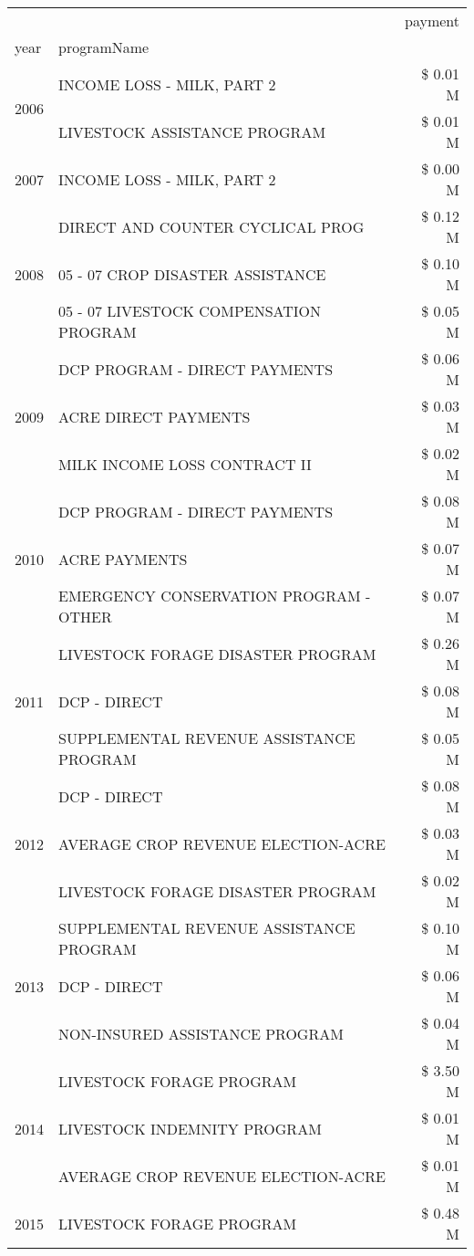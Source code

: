 \begin{tabular}{llr}
\toprule
 &  & payment \\
year & programName &  \\
\midrule
\multirow[t]{2}{*}{2006} & INCOME LOSS - MILK, PART 2 & \$ 0.01 M \\
 & LIVESTOCK ASSISTANCE PROGRAM & \$ 0.01 M \\
\cline{1-3}
2007 & INCOME LOSS - MILK, PART 2 & \$ 0.00 M \\
\cline{1-3}
\multirow[t]{3}{*}{2008} & DIRECT AND COUNTER CYCLICAL PROG & \$ 0.12 M \\
 & 05 - 07 CROP DISASTER ASSISTANCE & \$ 0.10 M \\
 & 05 - 07 LIVESTOCK COMPENSATION PROGRAM & \$ 0.05 M \\
\cline{1-3}
\multirow[t]{3}{*}{2009} & DCP PROGRAM - DIRECT PAYMENTS & \$ 0.06 M \\
 & ACRE DIRECT PAYMENTS & \$ 0.03 M \\
 & MILK INCOME LOSS CONTRACT II & \$ 0.02 M \\
\cline{1-3}
\multirow[t]{3}{*}{2010} & DCP PROGRAM - DIRECT PAYMENTS & \$ 0.08 M \\
 & ACRE PAYMENTS & \$ 0.07 M \\
 & EMERGENCY CONSERVATION PROGRAM - OTHER & \$ 0.07 M \\
\cline{1-3}
\multirow[t]{3}{*}{2011} & LIVESTOCK FORAGE DISASTER PROGRAM & \$ 0.26 M \\
 & DCP - DIRECT & \$ 0.08 M \\
 & SUPPLEMENTAL REVENUE ASSISTANCE PROGRAM & \$ 0.05 M \\
\cline{1-3}
\multirow[t]{3}{*}{2012} & DCP - DIRECT & \$ 0.08 M \\
 & AVERAGE CROP REVENUE ELECTION-ACRE & \$ 0.03 M \\
 & LIVESTOCK FORAGE DISASTER PROGRAM & \$ 0.02 M \\
\cline{1-3}
\multirow[t]{3}{*}{2013} & SUPPLEMENTAL REVENUE ASSISTANCE PROGRAM & \$ 0.10 M \\
 & DCP - DIRECT & \$ 0.06 M \\
 & NON-INSURED ASSISTANCE PROGRAM & \$ 0.04 M \\
\cline{1-3}
\multirow[t]{3}{*}{2014} & LIVESTOCK FORAGE PROGRAM & \$ 3.50 M \\
 & LIVESTOCK INDEMNITY PROGRAM & \$ 0.01 M \\
 & AVERAGE CROP REVENUE ELECTION-ACRE & \$ 0.01 M \\
\cline{1-3}
\multirow[t]{3}{*}{2015} & LIVESTOCK FORAGE PROGRAM & \$ 0.48 M \\

\end{tabular}
